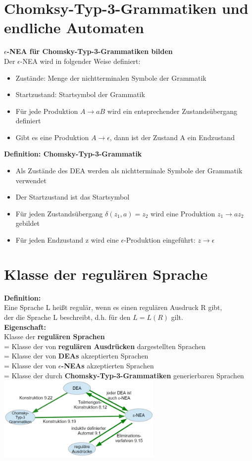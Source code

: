 \documentclass{scrreprt}
\newcommand\tab[1][1cm]{\hspace*{#1}}
\begin{document}
\section{Chomksy-Typ-3-Grammatiken und endliche Automaten}
\textbf{$\epsilon$-NEA für Chomsky-Typ-3-Grammatiken bilden}
\\\tab Der $\epsilon$-NEA wird in folgender Weise definiert:
\begin{itemize}
    \item Zustände: Menge der nichtterminalen Symbole der Grammatik
    \item Startzustand: Startsymbol der Grammatik
    \item Für jede Produktion $A \rightarrow aB$ wird ein entsprechender Zustandsübergang definiert
    \item Gibt es eine Produktion $A \rightarrow \epsilon$, dann ist der Zustand A ein Endzustand
\end{itemize}
\textbf{Definition: Chomsky-Typ-3-Grammatik}
\begin{itemize}
    \item Als Zustände des DEA werden als nichtterminale Symbole der Grammatik verwendet
    \item Der Startzustand ist das Startsymbol
    \item Für jeden Zustandsübergang $\delta (z_1,a)=z_2$ wird eine Produktion $z_1 \rightarrow a z_2$ gebildet
    \item Für jeden Endzustand z wird eine $\epsilon$-Produktion eingeführt: $z \rightarrow \epsilon$
\end{itemize}
\section{Klasse der regulären Sprache}
\textbf{Definition:}
\\\tab Eine Sprache L heißt regulär, wenn es einen regulären Ausdruck R gibt,
\\\tab der die Sprache L beschreibt, d.h. für den $L=L(R)$ gilt.
\\\textbf{Eigenschaft:}
\\\tab Klasse der \textbf{regulären Sprachen}
\\\tab = Klasse der von \textbf{regulären Ausdrücken} dargestellten Sprachen
\\\tab = Klasse der von \textbf{DEAs} akzeptierten Sprachen 
\\\tab = Klasse der von \textbf{$\epsilon$-NEAs} akzeptierten Sprachen
\\\tab = Klasse der durch \textbf{Chomsky-Typ-3-Grammatiken} generierbaren Sprachen
\\\includegraphics[width=0.6\textwidth]{"graphics/Eigenschaften"}
\end{document}
